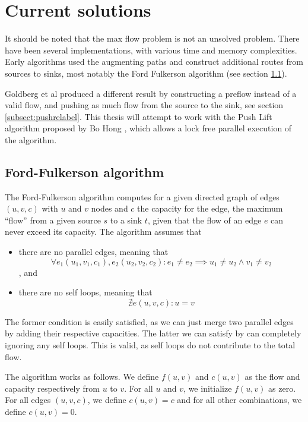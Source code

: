 \section{Current solutions}

It should be noted that the max flow problem is not an unsolved problem. There have been several implementations, with various time and memory complexities. Early algorithms used the augmenting paths\cite{LockFreeMultithreadedMaxFlow} and construct additional routes from sources to sinks, most notably the Ford Fulkerson algorithm (see section \ref{subsect:fordfulkerson}).

Goldberg et al produced a different result by constructing a preflow instead of a valid flow\cite{ANewApproachToTheMaxFlowProblem}, and pushing as much flow from the source to the sink, see section \ref{subsect:pushrelabel}. This thesis will attempt to work with the Push Lift algorithm proposed by Bo Hong \cite{LockFreeMultithreadedMaxFlow}, which allows a lock free parallel execution of the algorithm.

\subsection{Ford-Fulkerson algorithm}
\label{subsect:fordfulkerson}

The Ford-Fulkerson algorithm computes for a given directed graph of edges $(u, v, c)$ with $u$ and $v$ nodes and $c$ the capacity for the edge, the maximum ``flow'' from a given source $s$ to a sink $t$, given that the flow of an edge $e$ can never exceed its capacity. The algorithm assumes that

\begin{itemize}
\item there are no parallel edges, meaning that
$$
\forall e_1 (u_1, v_1, c_1), e_2(u_2, v_2, c_2): e_1 \neq e_2 \implies u_1 \neq u_2 \land v_1 \neq v_2
$$, and
\item there are no self loops, meaning that
$$
\nexists e (u, v, c): u = v
$$
\end{itemize}

The former condition is easily satisfied, as we can just merge two parallel edges by adding their respective capacities. The latter we can satisfy by can completely ignoring any self loops. This is valid, as self loops do not contribute to the total flow.

The algorithm works as follows. We define $f(u,v)$ and $c(u, v)$ as the flow and capacity respectively from $u$ to $v$. For all $u$ and $v$, we initialize $f(u, v)$ as zero. For all edges $(u, v, c)$, we define $c(u, v) = c$ and for all other combinations, we define $c(u, v) = 0$.

